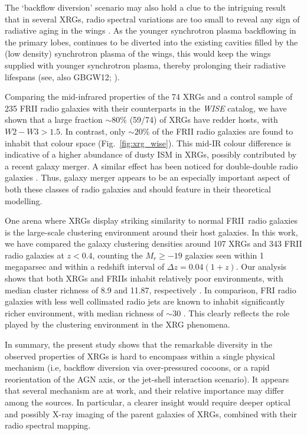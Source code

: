 \documentclass[twocolumn]{aastex62}
\def\frii{FR{II}~}
\begin{document}
The `backflow diversion' scenario may also hold a clue to the intriguing result 
that in several XRGs, radio spectral variations are too small to reveal any 
sign of radiative aging in the wings  \citep[see,][and refs. therein]{Lal2019arXiv190311632L}. 
As the younger synchrotron plasma backflowing in the primary lobes, continues 
to be diverted into the existing cavities filled by the (low density) 
synchrotron plasma of the wings, this would keep the wings supplied with 
younger synchrotron plasma, thereby prolonging their radiative lifespans 
(see, also GBGW12; \citealt{Hodges2012ApJ...746..167H,Saripalli2018ApJ...852...48S}).

 

Comparing the mid-infrared properties of the 74 XRGs and a control
sample of 235 FRII radio galaxies with their counterparts in the {\it WISE}
catalog, we have shown that a large fraction $\sim 80\%$ (59/74) of
XRGs have redder hosts, with $W2-W3 > 1.5$. In contrast, only $\sim 20$\% 
of the FRII radio galaxies are found to inhabit that colour space 
(Fig.~\ref{fig:xrg_wise}). This mid-IR colour difference is indicative of
a higher abundance of dusty ISM in XRGs, possibly contributed by a recent 
galaxy merger. A similar effect has been noticed for double-double radio 
galaxies \citet[][]{Kuzmicz2017MNRAS.471.3806K}. Thus, galaxy merger appears 
to be  an especially important aspect of both these classes of radio galaxies 
and should feature in their theoretical modelling.\par




One arena where XRGs display striking similarity to normal \frii radio 
galaxies is the large-scale clustering environment around their host 
galaxies. In this work, we have compared the galaxy clustering densities 
around 107 XRGs and 343 FRII radio galaxies at $z < 0.4$, counting the 
$M_r \ge -19$ galaxies seen within 1 megaparsec and within a redshift 
interval of $\Delta z = 0.04(1 + z)$. Our analysis shows that both XRGs 
and FRIIs inhabit relatively poor environments, with median cluster richness 
of 8.9 and 11.87, respectively \citep[also see,][]{Gendre2013MNRAS.430.3086G}. 
In comparison, FRI radio galaxies with less well collimated radio jets 
are known to inhabit significantly richer environment, with median richness 
of $\sim 30$ \citep[see,][]{Gendre2013MNRAS.430.3086G}. This clearly 
reflects the role played by the clustering environment in the XRG phenomena.

In summary, the present study shows that the remarkable diversity in the 
observed properties of XRGs is hard to encompass within a single physical 
mechanism (i.e, backflow diversion via over-pressured cocoons, or a rapid 
reorientation of the AGN axis, or the jet-shell interaction scenario). It
appears that several mechanism are at work, and their relative importance 
may differ among the sources.  In particular, a clearer insight  would require
deeper optical and possibly X-ray imaging of the parent galaxies of XRGs, 
combined with their radio spectral mapping.
\end{document}
